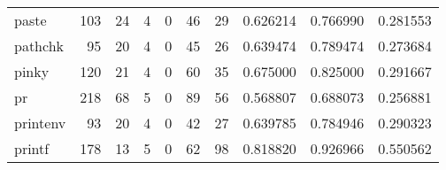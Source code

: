 \begin{longtable}{lrrrrrrrrr}
paste     &                                                103 &                                                 24 &                                                  4 &                                                  0 &                                                 46 &                                                 29 &                                           0.626214 &                               0.766990 &                             0.281553 \\
pathchk   &                                                 95 &                                                 20 &                                                  4 &                                                  0 &                                                 45 &                                                 26 &                                           0.639474 &                               0.789474 &                             0.273684 \\
pinky     &                                                120 &                                                 21 &                                                  4 &                                                  0 &                                                 60 &                                                 35 &                                           0.675000 &                               0.825000 &                             0.291667 \\
pr        &                                                218 &                                                 68 &                                                  5 &                                                  0 &                                                 89 &                                                 56 &                                           0.568807 &                               0.688073 &                             0.256881 \\
printenv  &                                                 93 &                                                 20 &                                                  4 &                                                  0 &                                                 42 &                                                 27 &                                           0.639785 &                               0.784946 &                             0.290323 \\
printf    &                                                178 &                                                 13 &                                                  5 &                                                  0 &                                                 62 &                                                 98 &                                           0.818820 &                               0.926966 &                             0.550562 \\

\end{longtable}
